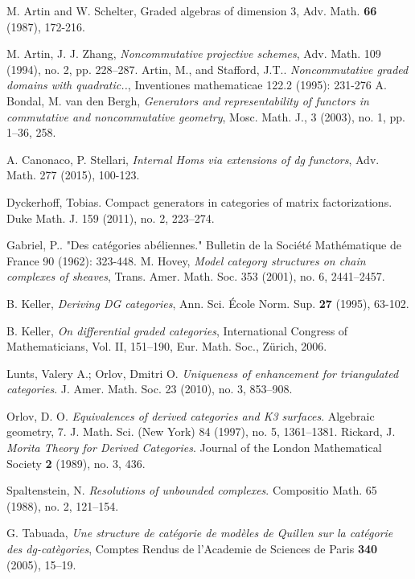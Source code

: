 \documentclass[reqno, 12pt]{amsart}
\begin{document}
\begin{thebibliography}{99}
 M. Artin and W. Schelter, Graded algebras of dimension 3, Adv. Math. \textbf{66} (1987), 172-216.
  
  M. Artin, J. J. Zhang, \emph{Noncommutative projective schemes}, Adv. Math. 109 (1994), no. 2, pp. 228--287.
  Artin, M., and Stafford, J.T.. \emph{Noncommutative graded domains with quadratic..}, Inventiones mathematicae 122.2 (1995): 231-276
  A. Bondal, M. van den Bergh, \emph{Generators and representability of functors in commutative and noncommutative geometry}, Mosc. Math. J., 3 (2003), no. 1, pp. 1--36, 258.
  
  A. Canonaco, P. Stellari, \emph{Internal Homs via extensions of dg functors}, Adv. Math. 277 (2015), 100-123.

  Dyckerhoff, Tobias. Compact generators in categories of matrix factorizations. Duke Math. J. 159 (2011), no. 2, 223--274.

  Gabriel, P.. "Des catégories abéliennes." Bulletin de la Société Mathématique de France 90 (1962): 323-448.
  M. Hovey, \emph{Model category structures on chain complexes of sheaves}, Trans. Amer. Math. Soc. 353 (2001), no. 6, 2441--2457.

  B. Keller, \emph{Deriving DG categories}, Ann. Sci. \'{E}cole Norm. Sup. \textbf{27} (1995), 63-102.

  B. Keller, \emph{On differential graded categories}, International Congress of Mathematicians, Vol. II, 151–190, Eur. Math. Soc., Z\"{u}rich, 2006.
  
  Lunts, Valery A.; Orlov, Dmitri O. {\em Uniqueness of enhancement for triangulated categories}. J. Amer. Math. Soc. 23 (2010), no. 3, 853--908.

  Orlov, D. O. {\em Equivalences of derived categories and K3 surfaces}. Algebraic geometry, 7. J.
  Math. Sci. (New York) 84 (1997), no. 5, 1361–1381.
  Rickard, J. {\em Morita Theory for Derived Categories}. Journal of the London Mathematical Society \textbf{2} (1989), no. 3, 436.

  Spaltenstein, N. {\em Resolutions of unbounded complexes}. Compositio Math. 65 (1988), no. 2, 121--154.

  G. Tabuada, \emph{Une structure de cat\'{e}gorie de mod\`{e}les de Quillen sur la cat\'{e}gorie des dg-cat\`{e}gories}, Comptes Rendus de l'Academie de Sciences de Paris \textbf{340} (2005), 15--19.
  

\end{thebibliography}
\end{document}
